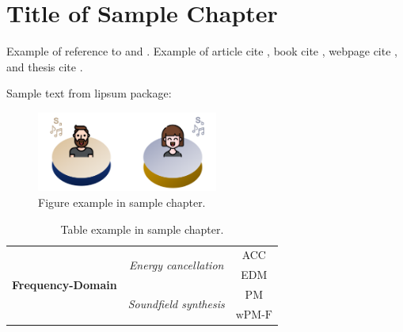 \documentclass[bookType,partialBuild]{../../ThesisClass/ThesisClass}
\begin{document}
\fi
\ifdefined \bookType
	\cleardoublepage
\fi



\chapter[Short Title of Sample Chapter]{Title of Sample Chapter}

Example of reference to  and . Example of article cite \cite{Elliott2012}, book cite \cite{Sayed2003}, webpage cite \cite{FFTW}, and thesis cite \cite{SimonGalvez2014}. 

Sample text from lipsum package: \lipsum[1-4]

\begin{figure}[t!]
\centering
\includegraphics[width=0.53\textwidth]{fig_example.png}
\caption[Short title for figure example in sample chapter.]{Figure example in sample chapter.}
\label{fig:example}
\end{figure}

\begin{table}[!b]
\centering
\begin{tabular}{ccc}
\toprule \toprule
\multirow{5}{*}{{\hspace{0.3cm}\textbf{Frequency-Domain}}\hspace{0.3cm}} 
& 
\multirow{2}{*}{{\hspace{0.3cm}\textit{Energy cancellation}\hspace{0.3cm}}}  
& 
{\small ACC}
\\
\cmidrule{3-3}
&                                                                     
& 
{\small EDM}
\\
\cmidrule{2-3}
& 
\multirow{2}{*}{{\hspace{0.3cm}\textit{Soundfield synthesis}\hspace{0.3cm}}} 
& 
{\small PM}
\\
\cmidrule{3-3}
& 
& 
{\small $\textrm{wPM-F}$ }
\\
\toprule \toprule
\end{tabular}
\caption[Short title for table example in sample chapter.]{Table example in sample chapter.}
\label{tab:example}
\end{table}
\end{document}
